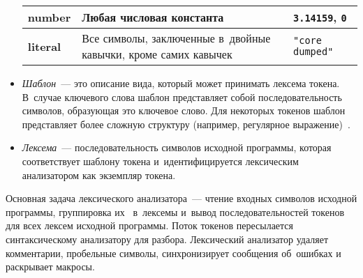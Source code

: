 \begin{itemize}
{\begin{table} [h!tbp]
\begin{tabular}{| p{3cm} | p{6cm} | p{5cm} |}
				\textbf{number}  	& 	Любая числовая константа													& 	\texttt{3.14159}, \texttt{0} 				\\ \hline
				\textbf{literal}  	& 	Все символы, заключенные в~двойные кавычки, кроме самих кавычек				& 	\texttt{"core dumped"} 						\\ \hline	
			\end{tabular}
		\end{table}	
	}
	\item{\textit{Шаблон}~--- это описание вида, который может принимать лексема токена. В~случае ключевого слова шаблон представляет собой последовательность символов, образующая это ключевое слово. Для некоторых токенов шаблон представляет более сложную структуру (например, регулярное выражение)~\cite{web2}.}
	\item{\textit{Лексема}~--- последовательность символов исходной программы, которая соответствует шаблону токена и~идентифицируется лексическим анализатором как экземпляр токена.}
\end{itemize}

Основная задача лексического анализатора~--- чтение входных символов исходной программы, группировка их ~в~лексемы и~вывод последовательностей токенов для всех лексем исходной программы. Поток токенов пересылается синтаксическому анализатору для разбора. Лексический анализатор удаляет комментарии, пробельные символы, синхронизирует сообщения об~ошибках и раскрывает макросы.